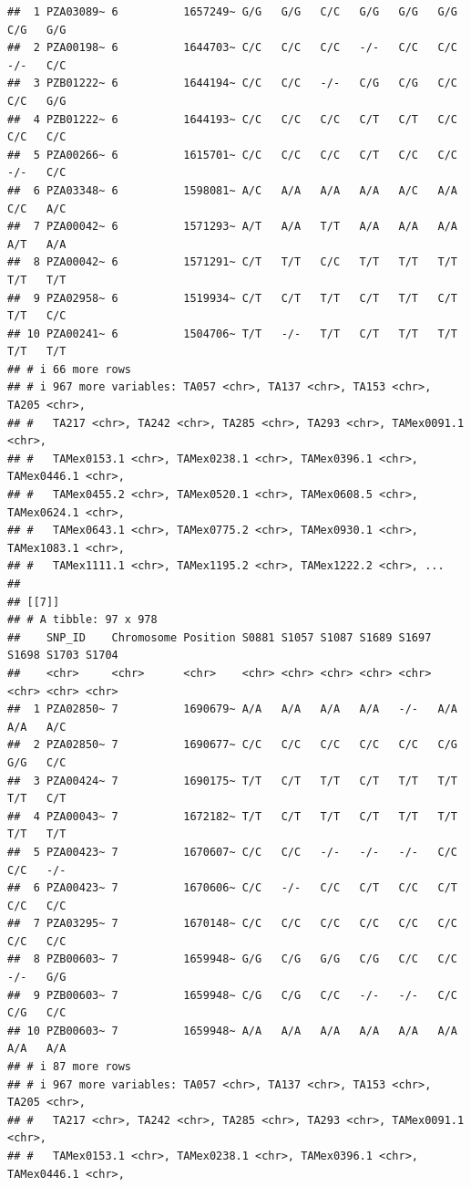 \documentclass[
]{article}
\begin{document}
\begin{verbatim}
##  1 PZA03089~ 6          1657249~ G/G   G/G   C/C   G/G   G/G   G/G   C/G   G/G  
##  2 PZA00198~ 6          1644703~ C/C   C/C   C/C   -/-   C/C   C/C   -/-   C/C  
##  3 PZB01222~ 6          1644194~ C/C   C/C   -/-   C/G   C/G   C/C   C/C   G/G  
##  4 PZB01222~ 6          1644193~ C/C   C/C   C/C   C/T   C/T   C/C   C/C   C/C  
##  5 PZA00266~ 6          1615701~ C/C   C/C   C/C   C/T   C/C   C/C   -/-   C/C  
##  6 PZA03348~ 6          1598081~ A/C   A/A   A/A   A/A   A/C   A/A   C/C   A/C  
##  7 PZA00042~ 6          1571293~ A/T   A/A   T/T   A/A   A/A   A/A   A/T   A/A  
##  8 PZA00042~ 6          1571291~ C/T   T/T   C/C   T/T   T/T   T/T   T/T   T/T  
##  9 PZA02958~ 6          1519934~ C/T   C/T   T/T   C/T   T/T   C/T   T/T   C/C  
## 10 PZA00241~ 6          1504706~ T/T   -/-   T/T   C/T   T/T   T/T   T/T   T/T  
## # i 66 more rows
## # i 967 more variables: TA057 <chr>, TA137 <chr>, TA153 <chr>, TA205 <chr>,
## #   TA217 <chr>, TA242 <chr>, TA285 <chr>, TA293 <chr>, TAMex0091.1 <chr>,
## #   TAMex0153.1 <chr>, TAMex0238.1 <chr>, TAMex0396.1 <chr>, TAMex0446.1 <chr>,
## #   TAMex0455.2 <chr>, TAMex0520.1 <chr>, TAMex0608.5 <chr>, TAMex0624.1 <chr>,
## #   TAMex0643.1 <chr>, TAMex0775.2 <chr>, TAMex0930.1 <chr>, TAMex1083.1 <chr>,
## #   TAMex1111.1 <chr>, TAMex1195.2 <chr>, TAMex1222.2 <chr>, ...
## 
## [[7]]
## # A tibble: 97 x 978
##    SNP_ID    Chromosome Position S0881 S1057 S1087 S1689 S1697 S1698 S1703 S1704
##    <chr>     <chr>      <chr>    <chr> <chr> <chr> <chr> <chr> <chr> <chr> <chr>
##  1 PZA02850~ 7          1690679~ A/A   A/A   A/A   A/A   -/-   A/A   A/A   A/C  
##  2 PZA02850~ 7          1690677~ C/C   C/C   C/C   C/C   C/C   C/G   G/G   C/C  
##  3 PZA00424~ 7          1690175~ T/T   C/T   T/T   C/T   T/T   T/T   T/T   C/T  
##  4 PZA00043~ 7          1672182~ T/T   C/T   T/T   C/T   T/T   T/T   T/T   T/T  
##  5 PZA00423~ 7          1670607~ C/C   C/C   -/-   -/-   -/-   C/C   C/C   -/-  
##  6 PZA00423~ 7          1670606~ C/C   -/-   C/C   C/T   C/C   C/T   C/C   C/C  
##  7 PZA03295~ 7          1670148~ C/C   C/C   C/C   C/C   C/C   C/C   C/C   C/C  
##  8 PZB00603~ 7          1659948~ G/G   C/G   G/G   C/G   C/C   C/C   -/-   G/G  
##  9 PZB00603~ 7          1659948~ C/G   C/G   C/C   -/-   -/-   C/C   C/G   C/C  
## 10 PZB00603~ 7          1659948~ A/A   A/A   A/A   A/A   A/A   A/A   A/A   A/A  
## # i 87 more rows
## # i 967 more variables: TA057 <chr>, TA137 <chr>, TA153 <chr>, TA205 <chr>,
## #   TA217 <chr>, TA242 <chr>, TA285 <chr>, TA293 <chr>, TAMex0091.1 <chr>,
## #   TAMex0153.1 <chr>, TAMex0238.1 <chr>, TAMex0396.1 <chr>, TAMex0446.1 <chr>,

\end{verbatim}
\end{document}
